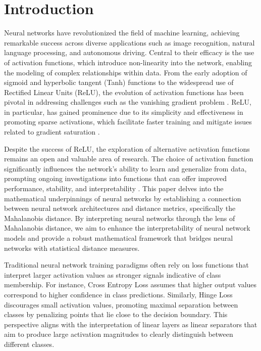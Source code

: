 
\section{Introduction}

Neural networks have revolutionized the field of machine learning, achieving remarkable success across diverse applications such as image recognition, natural language processing, and autonomous driving. Central to their efficacy is the use of activation functions, which introduce non-linearity into the network, enabling the modeling of complex relationships within data. From the early adoption of sigmoid and hyperbolic tangent (Tanh) functions to the widespread use of Rectified Linear Units (ReLU), the evolution of activation functions has been pivotal in addressing challenges such as the vanishing gradient problem \citep{glorot2010understanding, he2015delving}. ReLU, in particular, has gained prominence due to its simplicity and effectiveness in promoting sparse activations, which facilitate faster training and mitigate issues related to gradient saturation \citep{nair2010rectified}.

Despite the success of ReLU, the exploration of alternative activation functions remains an open and valuable area of research. The choice of activation function significantly influences the network's ability to learn and generalize from data, prompting ongoing investigations into functions that can offer improved performance, stability, and interpretability \citep{ramachandran2017searching}. This paper delves into the mathematical underpinnings of neural networks by establishing a connection between neural network architectures and distance metrics, specifically the Mahalanobis distance. By interpreting neural networks through the lens of Mahalanobis distance, we aim to enhance the interpretability of neural network models and provide a robust mathematical framework that bridges neural networks with statistical distance measures.

Traditional neural network training paradigms often rely on loss functions that interpret larger activation values as stronger signals indicative of class membership. For instance, Cross Entropy Loss \citep{bishop1995neural} assumes that higher output values correspond to higher confidence in class predictions. Similarly, Hinge Loss \citep{cortes1995support} discourages small activation values, promoting maximal separation between classes by penalizing points that lie close to the decision boundary. This perspective aligns with the interpretation of linear layers as linear separators that aim to produce large activation magnitudes to clearly distinguish between different classes.

